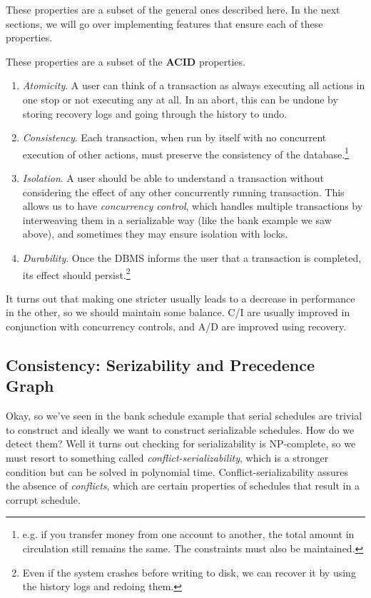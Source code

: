 \documentclass{article}
\begin{document}
    These properties are a subset of the general ones described here. In the next sections, we will go over implementing features that ensure each of these properties. 

    \begin{definition}[ACID]
      These properties are a subset of the \textbf{ACID} properties.
      \begin{enumerate}
        \item \textit{Atomicity}. A user can think of a transaction as always executing all actions in one stop or not executing any at all. In an abort, this can be undone by storing recovery logs and going through the history to undo. 
        \item \textit{Consistency}. Each transaction, when run by itself with no concurrent execution of other actions, must preserve the consistency of the database.\footnote{e.g. if you transfer money from one account to another, the total amount in circulation still remains the same. The constraints must also be maintained. } 
        \item \textit{Isolation}. A user should be able to understand a transaction without considering the effect of any other concurrently running transaction. This allows us to have \textit{concurrency control}, which handles multiple transactions by interweaving them in a serializable way (like the bank example we saw above), and sometimes they may ensure isolation with locks.  

        \item \textit{Durability}. Once the DBMS informs the user that a transaction is completed, its effect should persist.\footnote{Even if the system crashes before writing to disk, we can recover it by using the history logs and redoing them.}
      \end{enumerate}

      It turns out that making one stricter usually leads to a decrease in performance in the other, so we should maintain some balance. C/I are usually improved in conjunction with concurrency controls, and A/D are improved using recovery. 
    \end{definition}

  \subsection{Consistency: Serizability and Precedence Graph}

    Okay, so we've seen in the bank schedule example that serial schedules are trivial to construct and ideally we want to construct serializable schedules. How do we detect them? Well it turns out checking for serializability is NP-complete, so we must resort to something called \textit{conflict-serializability}, which is a stronger condition but can be solved in polynomial time. Conflict-serializability assures the absence of \textit{conflicts}, which are certain properties of schedules that result in a corrupt schedule.   
\end{document}
